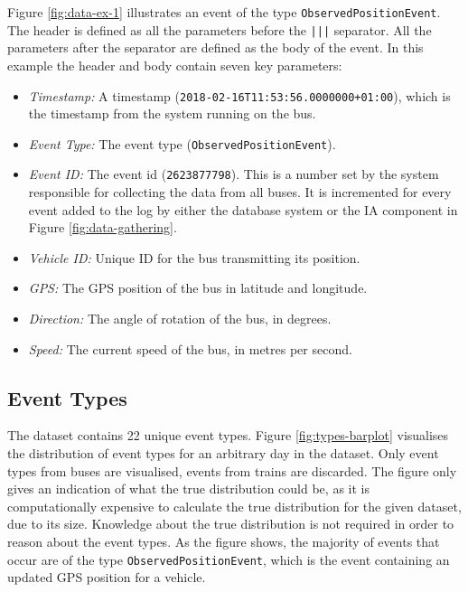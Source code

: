 Figure \ref{fig:data-ex-1} illustrates an event of the type \texttt{ObservedPositionEvent}.
The header is defined as all the parameters before the \texttt{|||} separator.
All the parameters after the separator are defined as the body of the event.
In this example the header and body contain seven key parameters: 
\begin{itemize}
    \item \textit{Timestamp:} A timestamp (\texttt{2018-02-16T11:53:56.0000000+01:00}), which is the timestamp from the system running on the bus.
    \item \textit{Event Type:} The event type (\texttt{ObservedPositionEvent}).
    \item \textit{Event ID:} The event id (\texttt{2623877798}). This is a number set by the system responsible for collecting the data from all buses.
    It is incremented for every event added to the log by either the database system or the IA component in Figure \ref{fig:data-gathering}.
    \item \textit{Vehicle ID:} Unique ID for the bus transmitting its position.
    \item \textit{GPS:} The GPS position of the bus in latitude and longitude.
    \item \textit{Direction:} The angle of rotation of the bus, in degrees.
    \item \textit{Speed:} The current speed of the bus, in metres per second.
\end{itemize}

\subsection{Event Types}
The dataset contains 22 unique event types.
Figure \ref{fig:types-barplot} visualises the distribution of event types for an arbitrary day in the dataset.
Only event types from buses are visualised, events from trains are discarded.
The figure only gives an indication of what the true distribution could be, as it is computationally expensive to calculate the true distribution for the given dataset, due to its size.
Knowledge about the true distribution is not required in order to reason about the event types.
As the figure shows, the majority of events that occur are of the type \texttt{ObservedPositionEvent}, which is the event containing an updated GPS position for a vehicle.

